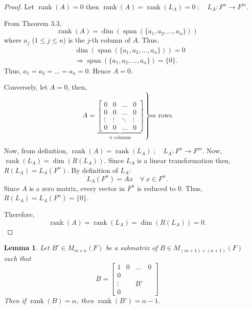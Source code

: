\documentclass[12pt, a4paper]{article}
\newtheorem{lemma}{Lemma}[section]
\theoremstyle{definition}
\theoremstyle{remark}
\DeclareMathOperator{\Span}{span}
\DeclareMathOperator{\rank}{rank}
\begin{document}
\begin{proof}
Let $\rank(A) = 0$ then $\rank(A) = \rank(L_A) = 0 \;; \quad L_A : F^n \to F^m$.

From Theorem 3.3,
\[
\rank(A) = \dim(\Span(\{a_1, a_2, \dots, a_n\}))
\]
where $a_j$ ($1 \le j \le n$) is the $j$-th column of $A$. Thus,
\begin{align*}
& \dim(\Span(\{a_1, a_2, \dots, a_n\})) = 0 \\
& \Rightarrow \Span(\{a_1, a_2, \dots, a_n\}) = \{0\}.
\end{align*}
Thus, $a_1 = a_2 = \dots = a_n = 0$. Hence $A = 0$.

Conversely, let $A = 0$, then,
\[
A = \left. \underbrace{\begin{bmatrix}
0 & 0 & \dots & 0 \\
0 & 0 & \dots & 0 \\
\vdots & \vdots & \ddots & \vdots \\
0 & 0 & \dots & 0
\end{bmatrix}}_{n \text{ columns}} \right\} m \text{ rows}
\]

Now, from definition, $\rank(A) = \rank(L_A) \;; \quad L_A : F^n \to F^m$. Now, $\rank(L_A) = \dim(R(L_A))$. Since $L_A$ is a linear transformation then, $R(L_A) = L_A(F^n)$. By definition of $L_A$:
\[
L_A(F^n) = Ax \quad \forall \ x \in F^n.
\]
Since $A$ is a zero matrix, every vector in $F^n$ is reduced to $0$. Thus, $R(L_A) = L_A(F^n) = \{0\}$.

Therefore,
\[
\rank(A) = \rank(L_A) = \dim(R(L_A)) = 0.
\]
\end{proof}

\begin{lemma}
Let $B' \in M_{m \times n}(F)$ be a submatrix of $B \in M_{(m+1) \times (n+1)}(F)$ such that
\[
B = \left[
\begin{array}{c|ccc}
1 & 0 & \dots & 0 \\ \hline
0 &   &       &   \\
\vdots & & B'    &   \\
0 &   &       &   
\end{array}
\right]
\]
Then if $\rank(B) = \alpha$, then $\rank(B') = \alpha - 1$.
\end{lemma}
\end{document}
